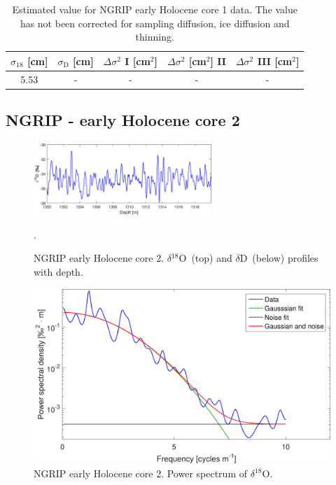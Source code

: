 \documentclass[11pt, draftcls, onecolumn]{IEEEtran} %
\numberwithin{equation}{section}
\numberwithin{table}{section}
\numberwithin{figure}{section}
\newcommand{\delOx}{$\delta{}^{18}\mathrm{O}$}
\newcommand{\delD}{$\delta\mathrm{D}$}
\begin{document}
\begin{appendices}
\begin{table}[H]
	\center
	\caption{Estimated value for NGRIP early Holocene core 1 data.
		The value has not been corrected for sampling diffusion, ice diffusion and thinning.}
	\label{NGRIP_early1_holo}
	\begin{tabular}{c c c c c} 
		\toprule
		$\sigma_{18}$ [cm] & $\sigma_\mathrm{D}$ [cm] & $\Delta\sigma^2$ I [cm$^2$] & $\Delta\sigma^2$ [cm$^2$] II & $\Delta\sigma^2$ III [cm$^2$] \\
		\midrule
		5.53 &   - &    - &     - &     - \\
		\bottomrule		
	\end{tabular}
\end{table}

\clearpage

\subsection{NGRIP - early Holocene core 2}

\begin{figure}[H]
	\vspace*{2mm}
	\begin{center}
		\includegraphics[width=0.6\textwidth]{NGRIP_early_2}
		\caption{NGRIP early Holocene core 2. \delOx~(top) and \delD~(below) profiles with depth.}  \label{fig:NGRIP_early_2}.
	\end{center}
\end{figure}

\begin{figure}[H]
	\vspace*{2mm}
	\begin{center}
		\includegraphics[width=.5\textwidth]{Figure_36}
		\caption{NGRIP early Holocene core 2. Power spectrum of \delOx.}  \label{fig:NGRIP_early2}
	\end{center}
\end{figure}


\end{appendices}
\end{document}
